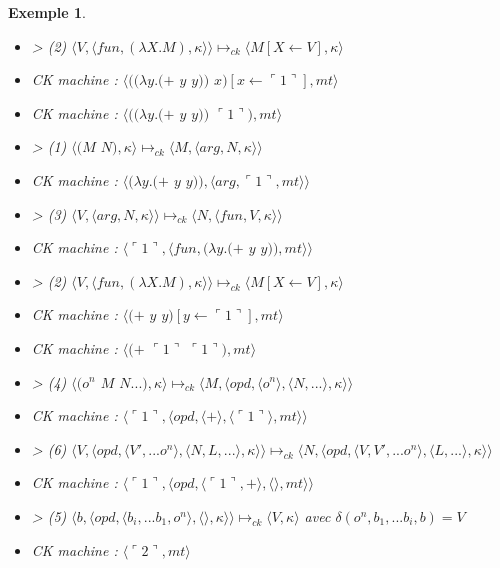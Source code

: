 \documentclass[10pt,a4paper]{report}
\newtheorem{ex}{Exemple}
\begin{document}
\begin{ex}
\begin{itemize}
			\item[] > (2) $\langle V,\langle fun,(\lambda X.M),\kappa \rangle \rangle \longmapsto_{ck} \langle M[X \leftarrow V],\kappa\rangle$		
			\item[] CK machine : $\langle((\lambda y.(+$ $y$ $y))$ $x)[x \leftarrow \ulcorner 1\urcorner ],mt\rangle$
			\item[] CK machine : $\langle((\lambda y.(+$ $y$ $y))$ $\ulcorner 1\urcorner),mt\rangle$
			\item[] > (1) $\langle(M$ $N),\kappa\rangle \longmapsto_{ck} \langle M,\langle arg,N,\kappa\rangle\rangle$
			\item[] CK machine : $\langle(\lambda y.(+$ $y$ $y)),\langle arg,\ulcorner 1\urcorner,mt\rangle\rangle$	
			\item[] > (3) $\langle V,\langle arg,N,\kappa \rangle \rangle \longmapsto_{ck} \langle N,\langle fun,V,\kappa \rangle \rangle$
			\item[] CK machine : $\langle\ulcorner 1\urcorner,\langle fun,(\lambda y.(+$ $y$ $y)),mt\rangle\rangle$	
			\item[] > (2) $\langle V,\langle fun,(\lambda X.M),\kappa \rangle \rangle \longmapsto_{ck} \langle M[X \leftarrow V],\kappa\rangle$	
			\item[] CK machine : $\langle(+$ $y$ $y)[y \leftarrow\ulcorner 1\urcorner],mt\rangle$
			\item[] CK machine : $\langle(+$ $\ulcorner 1\urcorner$ $\ulcorner 1\urcorner),mt\rangle$
			\item[] > (4) $\langle(o^{n}$ $M$ $N...),\kappa\rangle \longmapsto_{ck} \langle M,\langle opd,\langle o^{n}\rangle,\langle N,...\rangle,\kappa\rangle\rangle$
			\item[] CK machine : $\langle\ulcorner 1\urcorner,\langle opd,\langle + \rangle,\langle\ulcorner 1\urcorner\rangle,mt\rangle\rangle$
			\item[] > (6) $\langle V,\langle opd,\langle V',...o^{n}\rangle,\langle N,L,...\rangle,\kappa\rangle\rangle \longmapsto_{ck} \langle N,\langle opd,\langle V,V',...o^{n}\rangle,\langle L,...\rangle,\kappa\rangle\rangle$
			\item[] CK machine : $\langle\ulcorner 1\urcorner,\langle opd,\langle\ulcorner 1\urcorner,+ \rangle,\langle\rangle,mt\rangle\rangle$
			\item[] > (5) $\langle b,\langle opd,\langle b_{i},...b_{1},o^{n}\rangle,\langle\rangle,\kappa\rangle\rangle \longmapsto_{ck} \langle V,\kappa\rangle$ avec $\delta(o^{n},b_{1},...b_{i},b) = V$
			\item[] CK machine : $\langle\ulcorner 2\urcorner,mt\rangle$
		\end{itemize}
	\end{ex}
	\newpage
	
\end{document}
